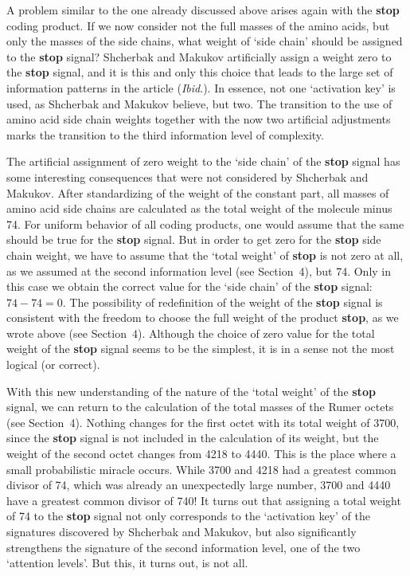 \documentclass[12pt]{article}
\begin{document}
A problem similar to the one already discussed above arises again with the \textbf{stop} coding product. If we now consider not the full masses of the amino acids, but only the masses of the side chains, what weight of `side chain' should be assigned to the \textbf{stop} signal? Shcherbak and Makukov artificially assign a weight zero to the \textbf{stop} signal, and it is this and only this choice that leads to the large set of information patterns in the article (\textit{Ibid}.). In essence, not one `activation key' is used, as Shcherbak and Makukov believe, but two. The transition to the use of amino acid side chain weights together with the now two artificial adjustments marks the transition to the third information level of complexity.

The artificial assignment of zero weight to the `side chain' of the \textbf{stop} signal has some interesting consequences that were not considered by Shcherbak and Makukov. After standardizing of the weight of the constant part, all masses of amino acid side chains are calculated as the total weight of the molecule minus 74. For uniform behavior of all coding products, one would assume that the same should be true for the \textbf{stop} signal. But in order to get zero for the \textbf{stop} side chain weight, we have to assume that the `total weight' of \textbf{stop} is not zero at all, as we assumed at the second information level (see Section~4), but 74. Only in this case we obtain the correct value for the `side chain' of the \textbf{stop} signal: $74 - 74 = 0$. The possibility of redefinition of the weight of the \textbf{stop} signal is consistent with the freedom to choose the full weight of the product \textbf{stop}, as we wrote above (see Section~4). Although the choice of zero value for the total weight of the \textbf{stop} signal seems to be the simplest, it is in a sense not the most logical (or correct).

With this new understanding of the nature of the `total weight' of the \textbf{stop} signal, we can return to the calculation of the total masses of the Rumer octets (see Section~4). Nothing changes for the first octet with its total weight of 3700, since the \textbf{stop} signal is not included in the calculation of its weight, but the weight of the second octet changes from 4218 to 4440. This is the place where a small probabilistic miracle occurs. While 3700 and 4218 had a greatest common divisor of 74, which was already an unexpectedly large number, 3700 and 4440 have a greatest common divisor of 740! It turns out that assigning a total weight of 74 to the \textbf{stop} signal not only corresponds to the `activation key' of the signatures discovered by Shcherbak and Makukov, but also significantly strengthens the signature of the second information level, one of the two `attention levels'. But this, it turns out, is not all.
\end{document}

